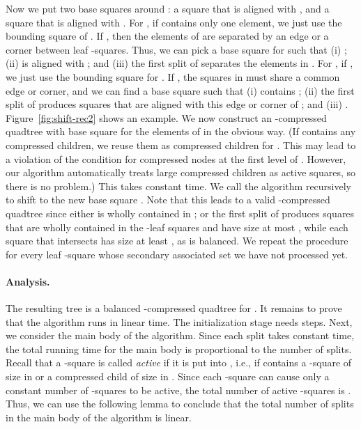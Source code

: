 \documentclass[11pt]{paper}
\begin{document}
      Now we put two base squares around : a square 
      that is aligned with , and a square  that is 
      aligned with . For , if  contains 
      only one element, we just use the bounding square of .
      If , then the elements
      of  are separated by an edge or a corner between 
      leaf -squares. Thus,
      we can pick a base square  for  such that 
      (i) ; (ii)  is 
      aligned with ; and (iii) the first split of  
      separates the elements in .
      For , if , we just use the bounding square for
      . If , the squares in  must share a common
      edge or corner, and we can find a base square  such that
      (i)  contains ; (ii) the first split of 
       produces squares that are aligned with this edge or 
      corner of ; and (iii) .
      Figure~\ref {fig:shift-rec2} shows an example.
      We now construct an -compressed quadtree 
      with base square  for the elements of 
      in the obvious way. (If  contains any compressed children, 
      we reuse them as compressed children for . This may 
      lead to a violation of the condition for compressed nodes at the 
      first level of . However, our algorithm automatically 
      treats large compressed children as active squares, so there is no 
      problem.) This takes constant time.  We call the algorithm recursively 
      to shift  to the new base
      square . Note that this leads to a valid -compressed
      quadtree since either  is wholly contained in ;
      or the first split of  produces squares that are wholly
      contained in the -leaf squares and have size at most ,
      while each square that intersects  has size at least
      , as  is  balanced. We repeat the procedure 
      for every leaf -square whose secondary associated set we 
      have not processed yet.
      
      \paragraph{Analysis.}
      The resulting tree  is a balanced -compressed quadtree
      for . It remains to prove that the algorithm runs in linear time.
      The initialization stage needs  steps.
      Next, we consider the main body of the algorithm.
      Since each split takes constant time, the total running time 
      for the main body is proportional to the number of 
      splits. Recall that a -square  is called \emph{active} if 
      it is put into , i.e., if  contains a -square of
      size in  or a compressed child of size
      in . Since each -square can cause only
      a constant number of -squares to be active, the total 
      number of active -squares is . Thus, we can use the following 
      lemma to conclude that the total number of
      splits in the main body of the algorithm is linear.
      
\end{document}
